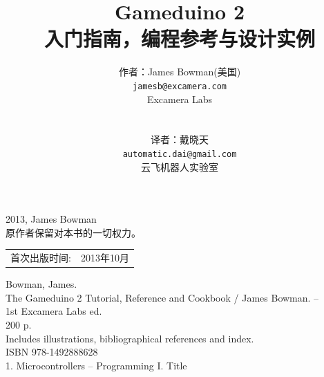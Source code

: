 \documentclass[10pt]{book}
\title{\LARGE \bf
Gameduino 2\\
入门指南，编程参考与设计实例
}
\author{作者：James Bowman(美国) \\
	{\tt\small jamesb@excamera.com} \\
  Excamera Labs\\
   \\
   \\
  译者：戴晓天\\
  {\tt\small automatic.dai@gmail.com} \\
  云飞机器人实验室
}
\date{}
\begin{document}
\begin{CJK}{UTF8}{gkai}
\maketitle

\begingroup
\footnotesize
\parindent 0pt
\parskip \baselineskip
\textcopyright{} 2013, James Bowman \\
原作者保留对本书的一切权力。

% 
% 
% 
% 

\begin{center}
\begin{tabular}{ll}
首次出版时间:  & 2013年10月 \\
\end{tabular}
\end{center}

\vfill

Bowman, James.\\
\hspace*{2em} The Gameduino 2 Tutorial, Reference and Cookbook / James Bowman. -- \\
\hspace*{1em} 1st Excamera Labs ed. \\
\hspace*{2em} 200 p. \hspace*{2em} \\
\hspace*{2em} Includes illustrations, bibliographical references and index. \\
\hspace*{2em} ISBN 978-1492888628 \\
\hspace*{2em} 1. Microcontrollers -- Programming \hspace*{2em} I. Title



\end{CJK}
\end{document}
